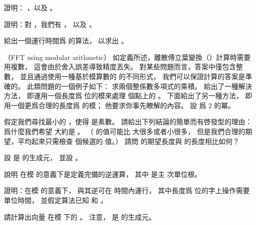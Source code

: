 \startANSWER
{}
\stopANSWER

\startigBase[continue]\startitem
證明： ，以及 。
\stopitem\stopigBase

\startANSWER
{}
\stopANSWER

\startigBase[continue]\startitem
證明：對 ，我們有 ，
以及 。
\stopitem\stopigBase

\startANSWER
{}
\stopANSWER

\startigBase[continue]\startitem
給出一個運行時間爲  的算法，
以求出 。
\stopitem\stopigBase

\startANSWER
{}
\stopANSWER
\stopPROBLEM

\startPROBLEM
（FFT using modular arithmetic）
如定義所述，離散傅立葉變換（）計算時需要用複數，
這會由於舍入誤差導致精度丟失。
對某些問題而言，答案中僅包含整數，
並且通過使用一種基於模算數的  的不同形式，
我們可以保證計算的答案是準確的。
此類問題的一個例子如下：
求兩個整係數多項式的乘積。
 給出了一種解決方法，
即運用一個長度爲  位的模來處理  個點上的 。
下面給出了另一種方法，
即用一個更爲合理的長度爲  的模；
他要求你事先瞭解的內容。
設  爲 2 的冪。

\startigBase[a]\startitem
假定我們尋找最小的 ，使得  是素數。
請給出下列結論的簡單而有啓發型的理由：
爲什麼我們希望  大約是 。
（ 的值可能比  大很多或者小很多，
但是我們合理的期望，平均起來只需檢查  個候選的  值。）
請問  的期望長度與  的長度相比如何？
\stopitem\stopigBase

\startANSWER
{}
\stopANSWER

設  是  的生成元，
並設 。

\startigBase[continue]\startitem
說明  在模  的意義下是定義完備的逆運算，
其中 \m{\omega} 是主  次單位根。
\stopitem\stopigBase

\startANSWER
{}
\stopANSWER

\startigBase[continue]\startitem
證明：在模  的意義下，  與其逆可在  時間內運行，
其中長度爲  位的字上操作需要單位時間，
並假定算法已知  和 \m{\omega}。
\stopitem\stopigBase

\startANSWER
{}
\stopANSWER

\startigBase[continue]\startitem
請計算出向量  在模  下的 。
注意，  是  的生成元。
\stopitem\stopigBase

\startANSWER
{}
\stopANSWER
\stopPROBLEM

\stopsubject%
